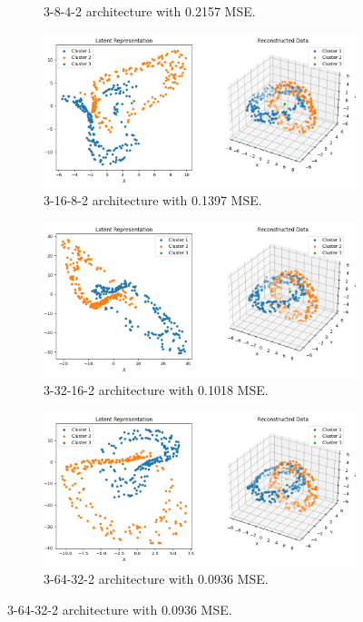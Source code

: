 \begin{figure}[htb]
\begin{subfigure}[b]{0.49\textwidth}
    \caption{3-8-4-2 architecture with 0.2157 MSE.}
    \label{fig:3-8-4-2}
  \end{subfigure}
  \hfill
  \begin{subfigure}[b]{0.49\textwidth}
    \centering
    \includegraphics[width=\linewidth]{images/RQ1/3-16-8-2_0.1397.png}
    \caption{3-16-8-2 architecture with 0.1397 MSE.}
    \label{fig:3-16-8-2}
  \end{subfigure}
  \hfill  
  \begin{subfigure}[b]{0.49\textwidth}
    \centering
    \includegraphics[width=\linewidth]{images/RQ1/3-32-16-2_0.1018.png}
    \caption{3-32-16-2 architecture with \textcolor{green!60!black}{0.1018} MSE.}
    \label{fig:3-32-16-2}
  \end{subfigure}
  \hfill  
  \begin{subfigure}[b]{0.49\textwidth}
    \centering
    \includegraphics[width=\linewidth]{images/RQ1/3-64-32-2_0.0936.png}
    \caption{3-64-32-2 architecture with \textcolor{green!80!black}{0.0936} MSE.}
    \label{fig:3-64-32-2}
  \end{subfigure}


\end{figure}
